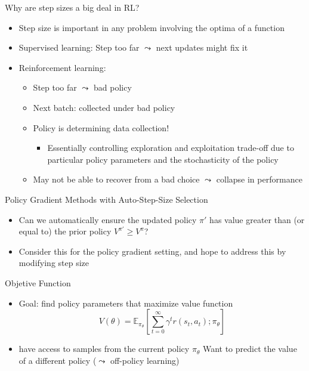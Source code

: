 \documentclass[aspectratio=169]{../latex_main/tntbeamer}  %
\begin{document}
\begin{frame}[c]{Why are step sizes a big deal in RL?}
	
    \begin{itemize}
        \item Step size is important in any problem involving the optima of a function
        \item Supervised learning: Step too far $\leadsto$ next updates might fix it
        \item Reinforcement learning:
        \begin{itemize}
            \item Step too far $\leadsto$ bad policy
            \item Next batch: collected under bad policy
            \item \alert{Policy is determining data collection!} 
            \begin{itemize}
                \item Essentially controlling exploration and exploitation trade-off due to particular policy parameters and the stochasticity of the policy
            \end{itemize}
            \item May not be able to recover from a bad choice $\leadsto$ collapse in performance
        \end{itemize}
    \end{itemize}

\end{frame}
\begin{frame}[c]{Policy Gradient Methods with Auto-Step-Size Selection}
	
    \begin{itemize}
        \item Can we automatically ensure the updated policy $\pi'$ has value greater than (or equal to) the prior policy $V^{\pi'} \geq V^\pi$?
        \item Consider this for the policy gradient setting, and hope to address this by modifying step size
    \end{itemize}

\end{frame}
\begin{frame}[c]{Objetive Function}
	
    \begin{itemize}
        \item Goal: find policy parameters that maximize value function
        $$ V(\theta) = \mathbb{E}_{\pi_\theta} \left[ \sum_{t=0}^{\infty} \gamma^t r(s_t, a_t); \pi_\theta \right]$$
        \item have access to samples from the current policy $\pi_\theta$ 
        \otem Want to predict the value of a different policy ($\leadsto$ off-policy learning)
    \end{itemize}

\end{frame}
\end{document}

